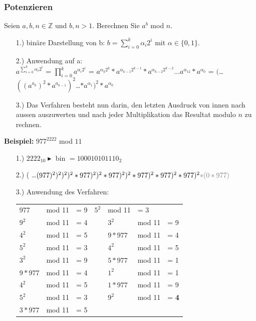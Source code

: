 \documentclass[10pt]{article}
\newcommand{\ZN}{\mathbb{Z}} %
\begin{document}
\subsubsection{Potenzieren}
Seien $a,b,n \in \ZN$ und $b,n > 1$. Berechnen Sie $a^b$ mod $n$.
\begin{itemize}
	\item[1.)] binäre Darstellung von b: $b=\sum_{i=0}^k \alpha_i2^i$ mit $\alpha \in \{0,1\}$.
	\item[2.)] Anwendung auf a: \\
		$a^{\sum_{i=0}^k \alpha_i2^i}$ = $\prod_{i=0}^{k} a^{\alpha_i2^i}$ = $a^{\alpha_k2^k}*a^{\alpha_{k-1}2^{k-1}}*a^{\alpha_{k-2}2^{k-2}} \dots  a^{\alpha_12}*a^{\alpha_0}$ = $($\dots$((a^{a_k})^2*a^{a_{k-1}})^2$\dots$*a^{\alpha_1})^2*a^{\alpha_0}$
	\item[3.)] Das Verfahren besteht nun darin, den letzten Ausdruck von innen nach aussen auszuwerten und nach jeder Multiplikation das Resultat modulo $n$ zu rechnen.
\end{itemize}
\textbf{Beispiel:}  $977^{2222}$ mod $11$
\begin{itemize}
	\item[1.)] $2222_{10} \blacktriangleright$ bin $= 100010101110_2$
	\item[2.)] ( \dots $ (977)^2)^2)^2)^2*977)^2)^2*977)^2)^2*977)^2*977)^2*977)^2 {\color{gray} *(0*977)}$
	\item[3.)] Anwendung des Verfahren: \\
	\begin{tabular}{l l l p{3cm} l l l}
	 977 & mod 11 & = 9     & $5^2$ & mod 11 & = 3 \\
	 $9^2$ & mod 11 & = 4   && $3^2$ & mod 11 & = 9 \\
	 $4^2$ & mod 11 & = 5   && $9*977$ & mod 11 & = 4 \\
	 $5^2$ & mod 11 & = 3   && $4^2$ & mod 11 & = 5 \\
	 $3^2$ & mod 11 & = 9   && $5*977$ & mod 11 & = 1 \\
	 $9*977$ & mod 11 & = 4 && $1^2$ & mod 11 & = 1 \\
	 $4^2$ & mod 11 & = 5   && $1*977$ & mod 11 & = 9 \\
	 $5^2$ & mod 11 & = 3   && $9^2$ & mod 11 & = \textbf{4} \\
	 $3*977$ & mod 11 & = 5\\

	\end{tabular}
\end{itemize}
\end{document}
